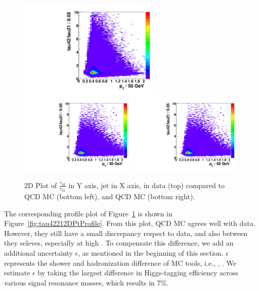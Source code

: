 \begin{figure}[ht!b]
\begin{center}
\includegraphics[width=0.6\textwidth,angle=0]{EXO-14-009/figs/SFExtra/tau4221Pt2DData.pdf}
\includegraphics[width=0.49\textwidth,angle=0]{EXO-14-009/figs/SFExtra/tau4221Pt2DPythia.pdf}
\includegraphics[width=0.49\textwidth,angle=0]{EXO-14-009/figs/SFExtra/tau4221Pt2DPythia.pdf}
\end{center}
\caption{ 2D Plot of
$\frac{\tau_{42}}{\tau_{21}}$ in Y axis, 
jet \pt in X axis, in data (top) compared to \PYTHIA QCD MC (bottom left), and
\HERWIG QCD MC (bottom right).
}
\label{fig:tau42212DPt}
\end{figure}

The corresponding profile plot of Figure~\ref{fig:tau42212DPt} is shown in 
Figure~\ref{fig:tau42212DPtProfile}. From this plot, QCD MC agrees well with 
data. However, they still have a small discrepancy respect to data, and also between
they seleves, especially at high \pt. To compensate this difference, we add an 
additional uncertainty $\epsilon$, as mentioned in the beginning of this section. 
$\epsilon$ represents the shower and hadronization difference of MC tools, i.e., 
\PYTHIA, \HERWIG.  We estimate $\epsilon$ by taking the largest difference in 
Higgs-tagging efficiency across various signal resonance masses, which results in 
7\%. 


